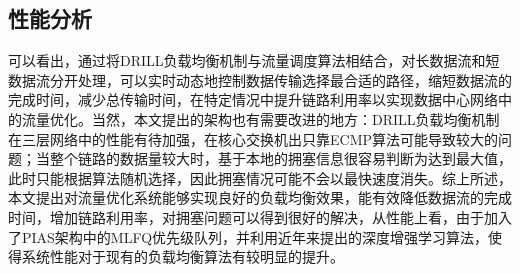 \subsection{性能分析}
可以看出，通过将DRILL负载均衡机制与流量调度算法相结合，对长数据流和短数据流分开处理，可以实时动态地控制数据传输选择最合适的路径，缩短数据流的完成时间，减少总传输时间，在特定情况中提升链路利用率以实现数据中心网络中的流量优化。当然，本文提出的架构也有需要改进的地方：DRILL负载均衡机制在三层网络中的性能有待加强，在核心交换机出只靠ECMP算法可能导致较大的问题；当整个链路的数据量较大时，基于本地的拥塞信息很容易判断为达到最大值，此时只能根据算法随机选择，因此拥塞情况可能不会以最快速度消失。综上所述，本文提出对流量优化系统能够实现良好的负载均衡效果，能有效降低数据流的完成时间，增加链路利用率，对拥塞问题可以得到很好的解决，从性能上看，由于加入了PIAS架构中的MLFQ优先级队列，并利用近年来提出的深度增强学习算法，使得系统性能对于现有的负载均衡算法有较明显的提升。

